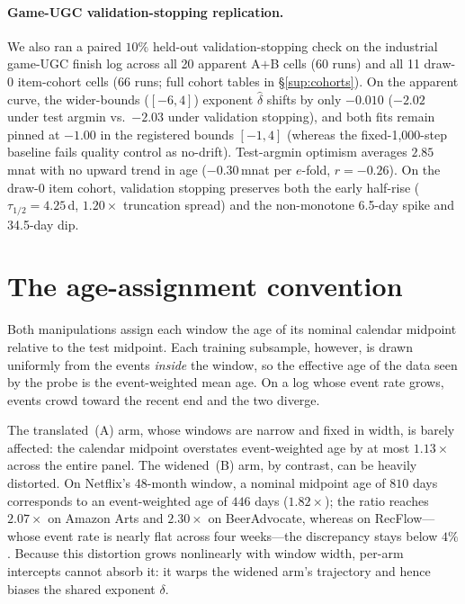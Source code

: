 \documentclass[10pt,letterpaper]{article}
\begin{document}
\paragraph{Game-UGC validation-stopping replication.}
We also ran a paired $10\%$ held-out validation-stopping check on the
industrial game-UGC finish log across all 20 apparent A${+}$B cells (60 runs)
and all 11 draw-0 item-cohort cells (66 runs; full cohort tables in
\S\ref{sup:cohorts}). On the apparent curve, the wider-bounds ($[-6, 4]$) exponent $\hat\delta$
shifts by only $-0.010$ ($-2.02$ under test argmin vs.\ $-2.03$ under validation stopping),
and both fits remain pinned at $-1.00$ in the registered bounds $[-1, 4]$ (whereas the
fixed-1,000-step baseline fails quality control as no-drift). Test-argmin optimism averages
$2.85$\,mnat with no upward trend in age ($-0.30$\,mnat per $e$-fold, $r = -0.26$).
On the draw-0 item cohort, validation stopping preserves both the early half-rise
($\tau_{1/2} = 4.25$\,d, $1.20\times$ truncation spread) and the non-monotone 6.5-day spike
and 34.5-day dip.

\section{The age-assignment convention}
\label{sup:agewt}

Both manipulations assign each window the age of its nominal calendar midpoint
relative to the test midpoint. Each training subsample, however, is drawn
uniformly from the events \emph{inside} the window, so the effective age of the
data seen by the probe is the event-weighted mean age. On a log whose event
rate grows, events crowd toward the recent end and the two diverge.

The translated~(A) arm, whose windows are narrow and fixed in width, is
barely affected: the calendar midpoint overstates event-weighted age by at most
$1.13\times$ across the entire panel. The widened~(B) arm, by contrast, can be heavily distorted. On
Netflix's 48-month window, a nominal midpoint age of $810$ days corresponds to an event-weighted age of $446$ days
($1.82\times$); the ratio reaches $2.07\times$ on Amazon Arts and $2.30\times$ on
BeerAdvocate, whereas on RecFlow---whose event rate is nearly flat across
four weeks---the discrepancy stays below $4\%$. Because this distortion
grows nonlinearly with window width, per-arm intercepts cannot absorb it:
it warps the widened arm's trajectory and hence biases
the shared exponent $\delta$.
\end{document}
